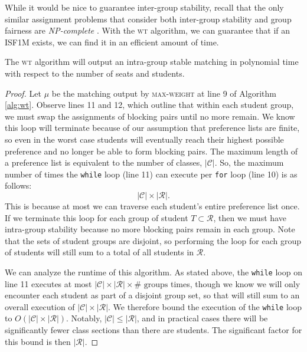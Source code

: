 While it would be nice to guarantee inter-group stability, recall that the only
similar assignment problems that consider both inter-group stability and
group fairness are \textit{NP-complete}  \cite{santhini}. With the \textsc{wt} algorithm, we can guarantee that if an ISF1M exists, we can find it in an efficient amount of time.

\begin{theorem}
  \label{thm:polywt}
  The \textsc{wt} algorithm will output an intra-group stable matching in
  polynomial time with respect to the number of seats and students.
\end{theorem}

\begin{proof}
  Let $\mu$ be the matching output by \textsc{max-weight} at
  line 9 of Algorithm \ref{alg:wt}. Observe lines 11 and 12, which outline that
  within each student group, we must swap the
  assignments of blocking pairs until no more remain. We know this loop will
  terminate because of our assumption that preference lists are finite, so even
  in the worst case
  students will eventually reach their highest possible preference and no longer
  be able to form blocking pairs. The maximum length of a preference list is
  equivalent to the number of classes, $|\mathcal{C}|$. So, the maximum number of times
  the \texttt{while} loop (line 11) can execute per \texttt{for} loop (line 10) is as follows: \[
  |\mathcal{C}| \times |\mathcal{R}|.\]
  This is because at most we can traverse each student's entire preference list once. If
  we terminate this loop for each group of student $T \subset \mathcal{R}$, then we must have
  intra-group stability because no more blocking pairs remain in each group.
  Note that the sets of student groups are disjoint, so performing the loop for
  each group of students will still sum to a total of all students in
  $\mathcal{R}$. 

  We can analyze the runtime of this algorithm. As stated above, the \texttt{while} loop on line
  11 executes at
  most $|\mathcal{C}| \times |\mathcal{R}| \times \# \text{ groups}$ times,
  though we know we will only encounter each student as part of a disjoint group
  set, so that will still sum to an overall execution of $|\mathcal{C}| \times
  |\mathcal{R}|$. We therefore bound the execution of the \texttt{while} loop to
  $O(|\mathcal{C}| \times |\mathcal{R}|)$. Notably, $|\mathcal{C}| \leq
  |\mathcal{R}|$, and in practical cases there will be significantly fewer
  class sections than there are students. The significant
  factor for this bound is then $|\mathcal{R}|$. 


\end{proof}
